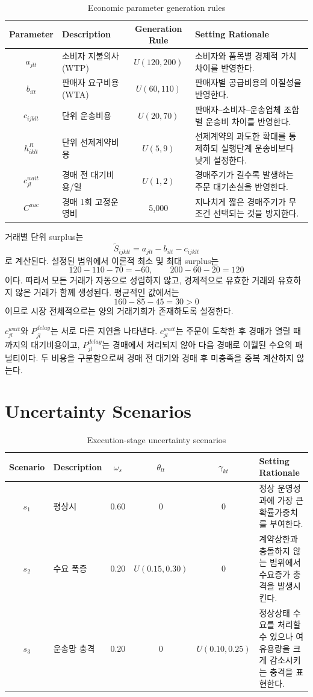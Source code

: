 \documentclass[11pt,a4paper]{article}
\begin{document}
\begin{table}[h!]
\centering
\begin{tabularx}{\textwidth}{clcY}
\toprule
\textbf{Parameter} & \textbf{Description} & \textbf{Generation Rule} & \textbf{Setting Rationale} \\
\midrule
$a_{jlt}$ & 소비자 지불의사(WTP) & $U(120,200)$ & 소비자와 품목별 경제적 가치 차이를 반영한다. \\
$b_{ilt}$ & 판매자 요구비용(WTA) & $U(60,110)$ & 판매자별 공급비용의 이질성을 반영한다. \\
$c_{ijklt}$ & 단위 운송비용 & $U(20,70)$ & 판매자--소비자--운송업체 조합별 운송비 차이를 반영한다. \\
$h^{R}_{iklt}$ & 단위 선제계약비용 & $U(5,9)$ & 선제계약의 과도한 확대를 통제하되 실행단계 운송비보다 낮게 설정한다. \\
$c^{wait}_{jl}$ & 경매 전 대기비용/일 & $U(1,2)$ & 경매주기가 길수록 발생하는 주문 대기손실을 반영한다. \\
$C^{auc}$ & 경매 1회 고정운영비 & 5,000 & 지나치게 짧은 경매주기가 무조건 선택되는 것을 방지한다. \\
\bottomrule
\end{tabularx}
\caption{Economic parameter generation rules}
\end{table}

거래별 단위 surplus는
\[
\widetilde S_{ijklt}=a_{jlt}-b_{ilt}-c_{ijklt}
\]
로 계산된다. 설정된 범위에서 이론적 최소 및 최대 surplus는
\[
120-110-70=-60,
\qquad
200-60-20=120
\]
이다. 따라서 모든 거래가 자동으로 성립하지 않고, 경제적으로 유효한 거래와 유효하지 않은 거래가 함께 생성된다. 평균적인 값에서는
\[
160-85-45=30>0
\]
이므로 시장 전체적으로는 양의 거래기회가 존재하도록 설정한다.

$c^{wait}_{jl}$와 $P^{delay}_{jl}$는 서로 다른 지연을 나타낸다. $c^{wait}_{jl}$는 주문이 도착한 후 경매가 열릴 때까지의 대기비용이고, $P^{delay}_{jl}$는 경매에서 처리되지 않아 다음 경매로 이월된 수요의 패널티이다. 두 비용을 구분함으로써 경매 전 대기와 경매 후 미충족을 중복 계산하지 않는다.

\section{Uncertainty Scenarios}

\begin{table}[h!]
\centering
\begin{tabularx}{\textwidth}{clcccY}
\toprule
\textbf{Scenario} & \textbf{Description} & $\omega_s$ & $\theta_{lt}$ & $\gamma_{kt}$ & \textbf{Setting Rationale} \\
\midrule
$s_1$ & 평상시 & 0.60 & 0 & 0 & 정상 운영성과에 가장 큰 확률가중치를 부여한다. \\
$s_2$ & 수요 폭증 & 0.20 & $U(0.15,0.30)$ & 0 & 계약상한과 충돌하지 않는 범위에서 수요증가 충격을 발생시킨다. \\
$s_3$ & 운송망 충격 & 0.20 & 0 & $U(0.10,0.25)$ & 정상상태 수요를 처리할 수 있으나 여유용량을 크게 감소시키는 충격을 표현한다. \\
\bottomrule
\end{tabularx}
\caption{Execution-stage uncertainty scenarios}
\end{table}
\end{document}
